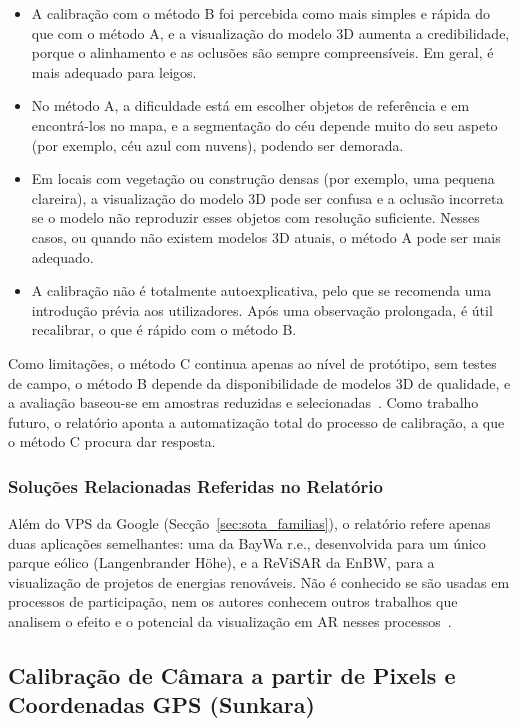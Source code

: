 \begin{itemize}
    \item A calibração com o método B foi percebida como mais simples e rápida do que com o método A, e a visualização do modelo 3D aumenta a credibilidade, porque o alinhamento e as oclusões são sempre compreensíveis. Em geral, é mais adequado para leigos.
    \item No método A, a dificuldade está em escolher objetos de referência e em encontrá-los no mapa, e a segmentação do céu depende muito do seu aspeto (por exemplo, céu azul com nuvens), podendo ser demorada.
    \item Em locais com vegetação ou construção densas (por exemplo, uma pequena clareira), a visualização do modelo 3D pode ser confusa e a oclusão incorreta se o modelo não reproduzir esses objetos com resolução suficiente. Nesses casos, ou quando não existem modelos 3D atuais, o método A pode ser mais adequado.
    \item A calibração não é totalmente autoexplicativa, pelo que se recomenda uma introdução prévia aos utilizadores. Após uma observação prolongada, é útil recalibrar, o que é rápido com o método B.
\end{itemize}

Como limitações, o método C continua apenas ao nível de protótipo, sem testes de campo, o método B depende da disponibilidade de modelos 3D de qualidade, e a avaliação baseou-se em amostras reduzidas e selecionadas~\cite[Sec.~2.2.2.4 e 2.3]{ar4wind2023}. Como trabalho futuro, o relatório aponta a automatização total do processo de calibração, a que o método C procura dar resposta.

\subsubsection{Soluções Relacionadas Referidas no Relatório}

Além do VPS da Google (Secção~\ref{sec:sota_familias}), o relatório refere apenas duas aplicações semelhantes: uma da BayWa r.e., desenvolvida para um único parque eólico (Langenbrander Höhe), e a ReViSAR da EnBW, para a visualização de projetos de energias renováveis. Não é conhecido se são usadas em processos de participação, nem os autores conhecem outros trabalhos que analisem o efeito e o potencial da visualização em AR nesses processos~\cite[Sec.~2.4]{ar4wind2023}.

\subsection{Calibração de Câmara a partir de Pixels e Coordenadas GPS (Sunkara)}
\label{sec:sunkara}

